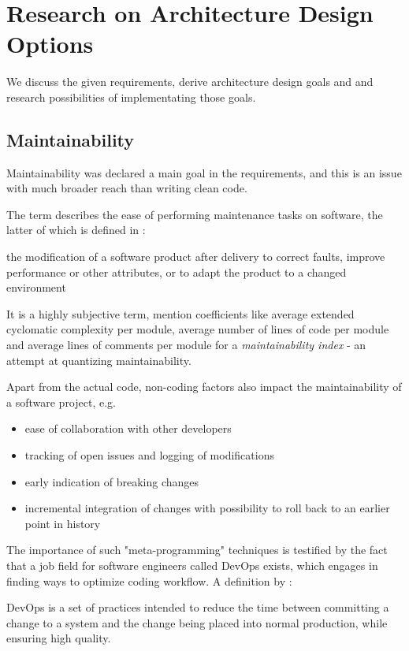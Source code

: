 \chapter{Research on Architecture Design Options}

We discuss the given requirements, derive architecture design goals and and research possibilities of implementating those goals.

\section{Maintainability}\label{sec:maintainability}
Maintainability was declared a main goal in the requirements, and this is an issue with much broader reach than writing clean code.

The term describes the ease of performing maintenance tasks on software, the latter of which is defined in \citet[p.234]{Bray1997} :
\begin{definition}[maintenance]
the modification of a software product after delivery to correct faults, improve performance or other attributes, or to adapt the product to a changed environment
\end{definition}

It is a highly subjective term, \citet[p.231]{Bray1997} mention coefficients like average extended cyclomatic complexity per module, average number of lines of code per module and average lines of comments per module for a \textit{maintainability index} - an attempt at quantizing maintainability.

Apart from the actual code, non-coding factors also impact the maintainability of a software project, e.g.
\begin{itemize}
	\item ease of collaboration with other developers
	\item tracking of open issues and logging of modifications
	\item early indication of breaking changes
	\item incremental integration of changes with possibility to roll back to an earlier point in history
\end{itemize}

The importance of such "meta-programming" techniques is testified by the fact that a job field for software engineers called \gls{DevOps} exists, which engages in finding ways to optimize coding workflow.
A definition by \citet[p.23]{Bass2015}:
\begin{definition}[DevOps]
	DevOps is a set of practices intended to reduce the time between committing a change to a system and the change being placed into normal production, while ensuring high quality.
\end{definition}

